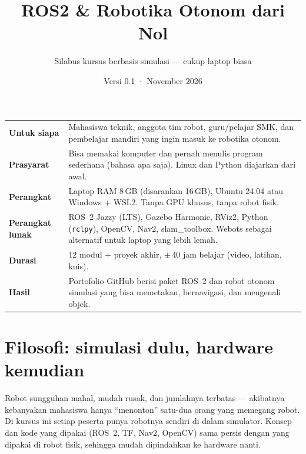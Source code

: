 \documentclass{rtl}
\title{ROS2 \& Robotika Otonom dari Nol}
\subtitle{Silabus kursus berbasis simulasi --- cukup laptop biasa}
\date{Versi 0.1 · November 2026}
\begin{document}
\makeheader

\begin{sorotan}[title={Ringkasan kursus}]
\begin{tabularx}{\linewidth}{@{}l X@{}}
\textbf{Untuk siapa} & Mahasiswa teknik, anggota tim robot, guru/pelajar SMK, dan pembelajar mandiri yang ingin masuk ke robotika otonom. \\
\textbf{Prasyarat} & Bisa memakai komputer dan pernah menulis program sederhana (bahasa apa saja). Linux dan Python diajarkan dari awal. \\
\textbf{Perangkat} & Laptop RAM 8\,GB (disarankan 16\,GB), Ubuntu 24.04 atau Windows + WSL2. Tanpa GPU khusus, tanpa robot fisik. \\
\textbf{Perangkat lunak} & ROS~2 Jazzy (LTS), Gazebo Harmonic, RViz2, Python (\texttt{rclpy}), OpenCV, Nav2, slam\_toolbox. Webots sebagai alternatif untuk laptop yang lebih lemah. \\
\textbf{Durasi} & 12 modul + proyek akhir, $\pm$\,40 jam belajar (video, latihan, kuis). \\
\textbf{Hasil} & Portofolio GitHub berisi paket ROS~2 dan robot otonom simulasi yang bisa memetakan, bernavigasi, dan mengenali objek. \\
\end{tabularx}
\end{sorotan}

\section*{Filosofi: simulasi dulu, hardware kemudian}
Robot sungguhan mahal, mudah rusak, dan jumlahnya terbatas --- akibatnya kebanyakan
mahasiswa hanya ``menonton'' satu-dua orang yang memegang robot. Di kursus ini setiap
peserta punya robotnya sendiri di dalam simulator. Konsep dan kode yang dipakai
(ROS~2, TF, Nav2, OpenCV) sama persis dengan yang dipakai di robot fisik, sehingga
mudah dipindahkan ke hardware nanti.
\end{document}
